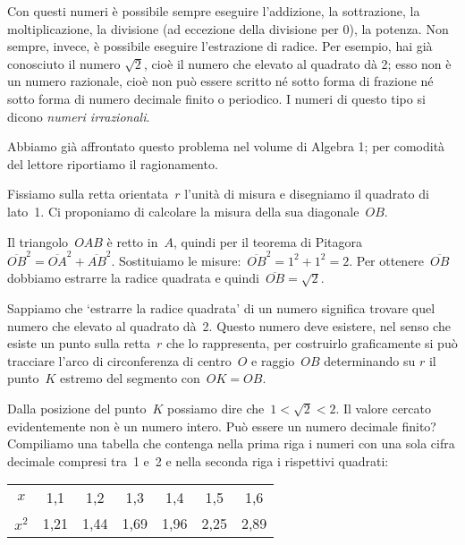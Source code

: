 Con questi numeri è possibile sempre eseguire l'addizione, la sottrazione, la moltiplicazione, la divisione (ad eccezione della divisione per 0), la potenza. Non sempre, invece, è possibile eseguire l'estrazione di radice. Per esempio, hai già conosciuto il numero $\sqrt{2}$, cioè il numero che elevato al quadrato dà 2; esso non è un numero razionale, cioè non può essere scritto né sotto forma di frazione né sotto forma di numero decimale finito o periodico. I numeri di questo tipo si dicono \emph{numeri irrazionali}.

Abbiamo già affrontato questo problema nel volume di Algebra 1; per comodità del lettore riportiamo il ragionamento.

Fissiamo sulla retta orientata~$r$ l'unità di misura e disegniamo il quadrato di lato~1. Ci proponiamo di calcolare
la misura della sua diagonale~$OB$.

\begin{center}
 
\end{center}

Il triangolo~$OAB$ è retto in~$A$, quindi per il teorema di
Pitagora~$\overline{OB}^{2}=\overline{OA}^{2}+\overline{AB}^{2}$.
Sostituiamo le misure:~$\overline{OB}^{2}=1^2+1^2=2$. Per ottenere~$\overline{OB}$
dobbiamo estrarre la radice quadrata e quindi~$\overline{OB}=\sqrt{2}$.

Sappiamo che `estrarre la radice quadrata' di un numero significa trovare quel numero
che elevato al quadrato dà~2. Questo numero deve esistere, nel senso
che esiste un punto sulla retta~$r$ che lo rappresenta, per costruirlo graficamente si può tracciare l'arco di
circonferenza di centro~$O$ e raggio~$OB$ determinando su $r$ il punto~$K$ estremo del segmento con~$OK = OB$.

Dalla posizione del punto~$K$ possiamo dire che~$1<\sqrt{2}<2$. Il
valore cercato evidentemente non è un numero intero. Può essere un
numero decimale finito? Compiliamo una tabella che contenga nella prima
riga i numeri con una sola cifra decimale compresi tra~1 e~2 e nella
seconda riga i rispettivi quadrati:

\begin{center}
\begin{tabular}{ccccccc}
\toprule
$x$ & 1,1 & 1,2 & 1,3 & 1,4 & 1,5 & 1,6\\
$x^{2}$ & 1,21 & 1,44 & 1,69 & 1,96 & 2,25 & 2,89\\
\bottomrule
\end{tabular}
\end{center}

